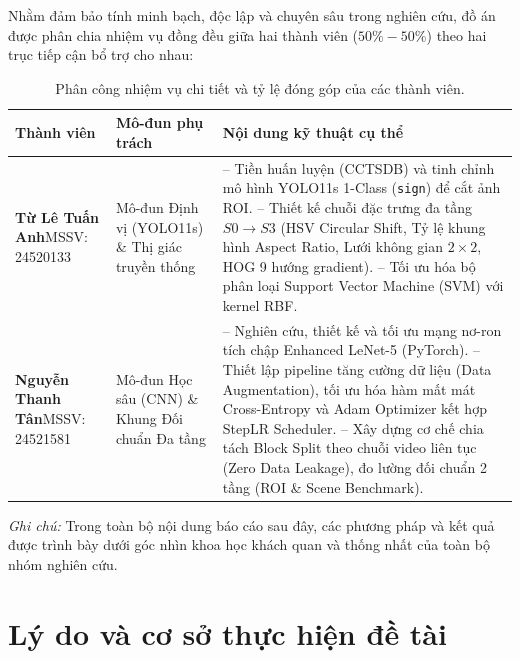 \documentclass[a4paper, 11pt]{article}
\begin{document}
Nhằm đảm bảo tính minh bạch, độc lập và chuyên sâu trong nghiên cứu, đồ án được phân chia nhiệm vụ đồng đều giữa hai thành viên ($50\% - 50\%$) theo hai trục tiếp cận bổ trợ cho nhau:

\begin{table}[H]
\centering
\small
\caption{Phân công nhiệm vụ chi tiết và tỷ lệ đóng góp của các thành viên.}
\label{tab:phan_cong}
\begin{tabularx}{\textwidth}{|p{3.2cm}|p{3.5cm}|Y|}
\hline
\textbf{Thành viên} & \textbf{Mô-đun phụ trách} & \textbf{Nội dung kỹ thuật cụ thể} \\
\hline
\textbf{Từ Lê Tuấn Anh}\newline MSSV: 24520133 & Mô-đun Định vị (YOLO11s) \& Thị giác truyền thống & 
-- Tiền huấn luyện (CCTSDB) và tinh chỉnh mô hình YOLO11s 1-Class (\texttt{sign}) để cắt ảnh ROI.\newline
-- Thiết kế chuỗi đặc trưng đa tầng $S0 \rightarrow S3$ (HSV Circular Shift, Tỷ lệ khung hình Aspect Ratio, Lưới không gian $2 \times 2$, HOG 9 hướng gradient).\newline
-- Tối ưu hóa bộ phân loại Support Vector Machine (SVM) với kernel RBF. \\
\hline
\textbf{Nguyễn Thanh Tân}\newline MSSV: 24521581 & Mô-đun Học sâu (CNN) \& Khung Đối chuẩn Đa tầng & 
-- Nghiên cứu, thiết kế và tối ưu mạng nơ-ron tích chập Enhanced LeNet-5 (PyTorch).\newline
-- Thiết lập pipeline tăng cường dữ liệu (Data Augmentation), tối ưu hóa hàm mất mát Cross-Entropy và Adam Optimizer kết hợp StepLR Scheduler.\newline
-- Xây dựng cơ chế chia tách Block Split theo chuỗi video liên tục (Zero Data Leakage), đo lường đối chuẩn 2 tầng (ROI \& Scene Benchmark). \\
\hline
\end{tabularx}
\end{table}

\textit{Ghi chú:} Trong toàn bộ nội dung báo cáo sau đây, các phương pháp và kết quả được trình bày dưới góc nhìn khoa học khách quan và thống nhất của toàn bộ nhóm nghiên cứu.


\cleardoublepage
{}
\setcounter{page}{1}

\section{Lý do và cơ sở thực hiện đề tài}
\label{sec:ly_do}
\end{document}
